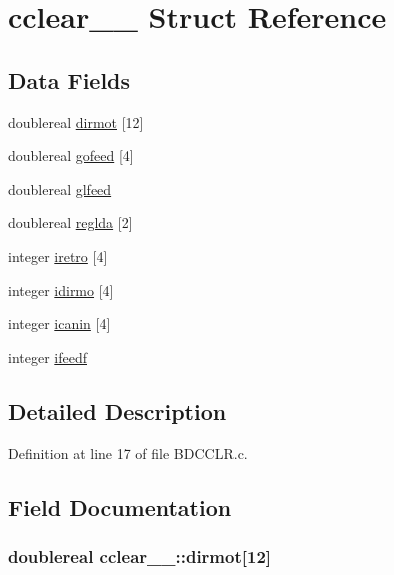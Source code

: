 \hypertarget{structcclear__1__}{}\section{cclear\+\_\+\_\+ Struct Reference}
\label{structcclear__1__}
\subsection*{Data Fields}
\begin{DoxyCompactItemize}
\item 
doublereal \hyperlink{structcclear__1___a7c5d78cc8d83a1083316c06ffe90144d}{dirmot} \mbox{[}12\mbox{]}
\item 
doublereal \hyperlink{structcclear__1___a493221579dcabeb94c569da046450b15}{gofeed} \mbox{[}4\mbox{]}
\item 
doublereal \hyperlink{structcclear__1___afc1e683ac8daa27a7285ce6ce4172efb}{glfeed}
\item 
doublereal \hyperlink{structcclear__1___afb870c7c64305648bb770a0784f49b71}{reglda} \mbox{[}2\mbox{]}
\item 
integer \hyperlink{structcclear__1___a5242b62d5db814a2fed56dbd375ff7d6}{iretro} \mbox{[}4\mbox{]}
\item 
integer \hyperlink{structcclear__1___ac5075c8128ae79543dea26f318409fbd}{idirmo} \mbox{[}4\mbox{]}
\item 
integer \hyperlink{structcclear__1___a1de2d48aba01f00b2dbf2cb46b9eea35}{icanin} \mbox{[}4\mbox{]}
\item 
integer \hyperlink{structcclear__1___ad6c037e974060d20a412097dd58ba26a}{ifeedf}
\end{DoxyCompactItemize}


\subsection{Detailed Description}


Definition at line 17 of file B\+D\+C\+C\+L\+R.\+c.



\subsection{Field Documentation}
\subsubsection[{\texorpdfstring{dirmot}{dirmot}}]{\setlength{\rightskip}{0pt plus 5cm}doublereal cclear\+\_\+\_\+\+::dirmot\mbox{[}12\mbox{]}}\hypertarget{structcclear__1___a7c5d78cc8d83a1083316c06ffe90144d}{}\label{structcclear__1___a7c5d78cc8d83a1083316c06ffe90144d}


